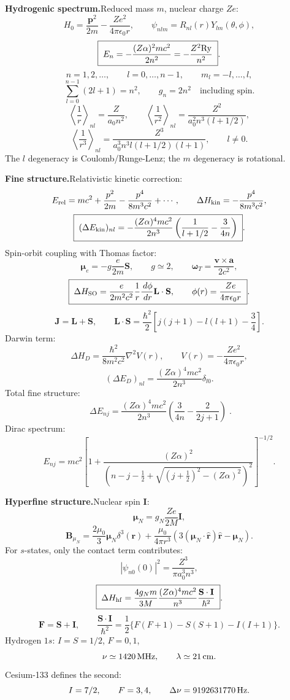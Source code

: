 \noindent\textbf{Hydrogenic spectrum.}\quad Reduced mass $m$, nuclear charge $Ze$:
\[
H_0=\frac{\mathbf p^2}{2m}-\frac{Ze^2}{4\pi\epsilon_0r},\qquad
\psi_{nlm}=R_{nl}(r)Y_{lm}(\theta,\phi),
\]
\[
\boxed{\;E_n=-\frac{(Z\alpha)^2mc^2}{2n^2}
=-\frac{Z^2{\rm Ry}}{n^2}\;}.
\]
\[
n=1,2,\ldots,\qquad l=0,\ldots,n-1,\qquad m_l=-l,\ldots,l,
\]
\[
\sum_{l=0}^{n-1}(2l+1)=n^2,\qquad
g_n=2n^2\quad\text{including spin}.
\]
\[
\left\langle\frac1r\right\rangle_{nl}=\frac{Z}{a_0n^2},\qquad
\left\langle\frac1{r^2}\right\rangle_{nl}
=\frac{Z^2}{a_0^2n^3(l+1/2)},
\]
\[
\left\langle\frac1{r^3}\right\rangle_{nl}
=\frac{Z^3}{a_0^3n^3l(l+1/2)(l+1)},\qquad l\ne0.
\]
The $l$ degeneracy is Coulomb/Runge-Lenz; the $m$ degeneracy is rotational.

\noindent\textbf{Fine structure.}\quad Relativistic kinetic correction:
\[
E_{\rm rel}=mc^2+\frac{p^2}{2m}-\frac{p^4}{8m^3c^2}+\cdots,\qquad
\Delta H_{\rm kin}=-\frac{p^4}{8m^3c^2},
\]
\[
\boxed{\;(\Delta E_{\rm kin})_{nl}
=-\frac{(Z\alpha)^4mc^2}{2n^3}
\left(\frac1{l+1/2}-\frac{3}{4n}\right)\;}.
\]
Spin-orbit coupling with Thomas factor:
\[
\boldsymbol\mu_e=-g\frac{e}{2m}\mathbf S,\qquad g\simeq2,\qquad
\boldsymbol\omega_T=\frac{\mathbf v\times\mathbf a}{2c^2},
\]
\[
\boxed{\;\Delta H_{\rm SO}
=\frac{e}{2m^2c^2}\frac1r\frac{\,d\phi}{\,d r}\mathbf L\cdot\mathbf S,\qquad
\phi(r)=\frac{Ze}{4\pi\epsilon_0r}\;}.
\]
\[
\mathbf J=\mathbf L+\mathbf S,\qquad
\mathbf L\cdot\mathbf S
=\frac{\hbar^2}{2}\left[j(j+1)-l(l+1)-\frac34\right].
\]
Darwin term:
\[
\Delta H_D=\frac{\hbar^2}{8m^2c^2}\nabla^2V(r),\qquad
V(r)=-\frac{Ze^2}{4\pi\epsilon_0r},
\]
\[
(\Delta E_D)_{nl}=\frac{(Z\alpha)^4mc^2}{2n^3}\delta_{l0}.
\]
Total fine structure:
\[
\boxed{\;\Delta E_{nj}
=\frac{(Z\alpha)^4mc^2}{2n^3}
\left(\frac{3}{4n}-\frac{2}{2j+1}\right)\;}.
\]
Dirac spectrum:
\[
E_{nj}=mc^2\left[
1+\frac{(Z\alpha)^2}
{\left(n-j-\frac12+\sqrt{(j+\frac12)^2-(Z\alpha)^2}\right)^2}
\right]^{-1/2}.
\]

\noindent\textbf{Hyperfine structure.}\quad Nuclear spin $\mathbf I$:
\[
\boldsymbol\mu_N=g_N\frac{Ze}{2M}\mathbf I,
\]
\[
\mathbf B_{\mu_N}=\frac{2\mu_0}{3}\boldsymbol\mu_N\delta^3(\mathbf r)
+\frac{\mu_0}{4\pi r^3}
\left(3(\boldsymbol\mu_N\cdot\hat{\mathbf r})\hat{\mathbf r}
-\boldsymbol\mu_N\right).
\]
For $s$-states, only the contact term contributes:
\[
|\psi_{n0}(0)|^2=\frac{Z^3}{\pi a_0^3n^3},
\]
\[
\boxed{\;\Delta H_{\rm hf}
=\frac{4g_Nm}{3M}\frac{(Z\alpha)^4mc^2}{n^3}
\frac{\mathbf S\cdot\mathbf I}{\hbar^2}\;}.
\]
\[
\mathbf F=\mathbf S+\mathbf I,\qquad
\frac{\mathbf S\cdot\mathbf I}{\hbar^2}
=\frac12\{F(F+1)-S(S+1)-I(I+1)\}.
\]
Hydrogen $1s$: $I=S=1/2$, $F=0,1$,
\[
\nu\simeq1420\,{\rm MHz},\qquad \lambda\simeq21\,{\rm cm}.
\]
Cesium-133 defines the second:
\[
I=7/2,\qquad F=3,4,\qquad \Delta\nu=9192631770\,{\rm Hz}.
\]

